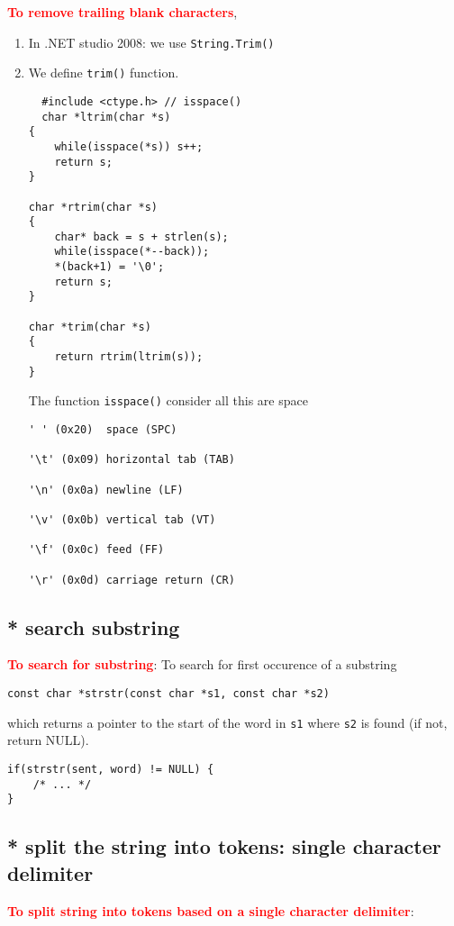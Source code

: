 \textcolor{red}{\bf To remove trailing blank characters}, 
\begin{enumerate}
  \item In .NET studio 2008: we use \verb!String.Trim()!
  \item We define \verb!trim()! function.
  \begin{verbatim}
  #include <ctype.h> // isspace()
  char *ltrim(char *s)
{
    while(isspace(*s)) s++;
    return s;
}

char *rtrim(char *s)
{
    char* back = s + strlen(s);
    while(isspace(*--back));
    *(back+1) = '\0';
    return s;
}

char *trim(char *s)
{
    return rtrim(ltrim(s)); 
}
\end{verbatim}
The function \verb!isspace()! consider all this are space
\begin{verbatim}
' ' (0x20)	space (SPC)

'\t' (0x09)	horizontal tab (TAB)

'\n' (0x0a)	newline (LF)

'\v' (0x0b)	vertical tab (VT)

'\f' (0x0c)	feed (FF)

'\r' (0x0d)	carriage return (CR)
\end{verbatim}
\end{enumerate}

\subsection{* search substring}

\textcolor{red}{\bf To search for substring}: To search for first occurence of a
substring
\begin{verbatim}
const char *strstr(const char *s1, const char *s2)
\end{verbatim}
which returns a pointer to the start of the word in \verb!s1! where \verb!s2! is
found (if not, return NULL).
\begin{verbatim}
if(strstr(sent, word) != NULL) {
    /* ... */
}
\end{verbatim}


\subsection{* split the string into tokens: single character delimiter}

\textcolor{red}{\bf To split string into tokens based on a single character
delimiter}:

